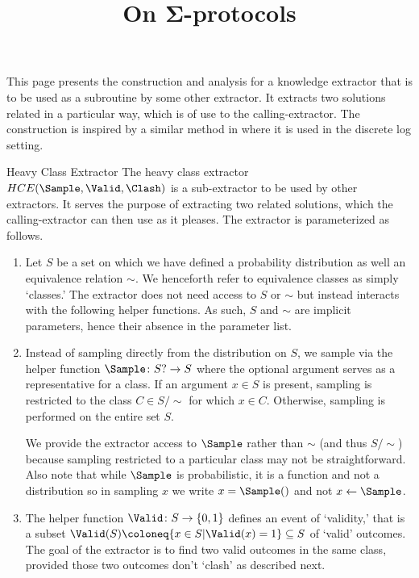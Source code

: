 This page presents the construction and analysis for a knowledge extractor that is to be used as a subroutine by some other extractor.
It extracts two solutions related in a particular way, which is of use to the calling-extractor.
The construction is inspired by a similar method in \cite{Dam10} where it is used in the discrete log setting.

\begin{references}
    \title{On Σ-protocols}
    \where{}
    \other
\end{references}

\begin{theorem}{Heavy Class Extractor}
    The heavy class extractor $HCE(\Sample,\Valid,\Clash)$ is a sub-extractor to be used by other extractors.
    It serves the purpose of extracting two related solutions, which the calling-extractor can then use as it pleases.
    The extractor is parameterized as follows.
    \begin{enumerate}
        \item
        Let $S$ be a set on which we have defined a probability distribution as well an equivalence relation $\sim$.
        We henceforth refer to equivalence classes as simply `classes.'
        The extractor does not need access to $S$ or $\sim$ but instead interacts with the following helper functions.
        As such, $S$ and $\sim$ are implicit parameters, hence their absence in the parameter list.

        \item
        Instead of sampling directly from the distribution on $S$, we sample via the helper function $\Sample\colon S?\to S$ where the optional argument serves as a representative for a class.
        If an argument $x\in S$ is present, sampling is restricted to the class $C\in S/\sim$ for which $x\in C$.
        Otherwise, sampling is performed on the entire set $S$.

        We provide the extractor access to $\Sample$ rather than $\sim$ (and thus $S/\sim$) because sampling restricted to a particular class may not be straightforward.
        Also note that while $\Sample$ is probabilistic, it is a function and not a distribution so in sampling $x$ we write $x=\Sample()$ and not $x\leftarrow\Sample$.

        \item
        The helper function $\Valid\colon S\to\{0,1\}$ defines an event of `validity,' that is a subset $\Valid(S)\coloneq\{x\in S|\Valid(x)=1\}\subseteq S$ of `valid' outcomes.
        The goal of the extractor is to find two valid outcomes in the same class, provided those two outcomes don't `clash' as described next.


\end{enumerate}
\end{theorem}
